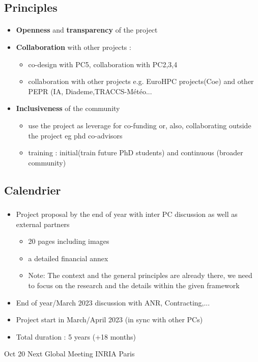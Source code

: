 \subsection{Principles}
\begin{frame}[fragile=singleslide]{\insertsectionhead}
  \framesubtitle{\insertsubsectionhead}

  \begin{itemize}
    \item \textbf{Openness} and \textbf{transparency} of the project 
    \item \textbf{Collaboration} with other projects : 
    \begin{itemize}
      \item 
        co-design with PC5, collaboration with PC2,3,4\
        \item 
          collaboration with other projects e.g. EuroHPC projects(Coe) and other PEPR (IA, Diademe,TRACCS-Météo...
    \end{itemize}
    \item \textbf{Inclusiveness} of the community 
    \begin{itemize}
      \item use the project as leverage for co-funding  or, also, collaborating outside the project eg phd co-advisors
      \item training : initial(train future PhD students) and continuous (broader community)
    \end{itemize}      
  \end{itemize}

\end{frame}

\subsection{Calendrier}
\begin{frame}
  \frametitle{\insertsectionhead}

  \begin{itemize}
    \item Project proposal by the end of year with inter PC discussion as well as external partners
    \begin{itemize}
      \item 20 pages including images
      \item a detailed financial annex
      \item \alert{Note}: The context and the general principles are already there, we need to focus on the research and the details within the given framework
    \end{itemize}
    \item End of year/March 2023 discussion with ANR, Contracting,...
    \item Project start in March/April 2023 (in sync with other PCs)
    \item Total duration : 5 years (+18 months)
  \end{itemize}

  \begin{alertblock}{Oct 20}
    Next Global Meeting INRIA Paris
  \end{alertblock}
\end{frame}

